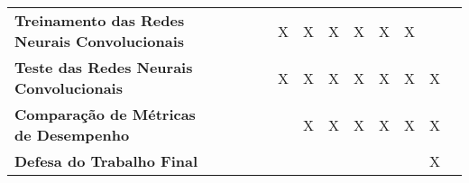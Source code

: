 \begin{table}
\begin{center}
\begin{small}
\begin{tabular}{p{5cm}cccccccccccc}
  \textbf{Treinamento das
  Redes Neurais Convolucionais}         &             &             &             &             &      X      &      X      &      X      &      X      &      X      &      X       &            \\
  \textbf{Teste das Redes
  Neurais Convolucionais}               &             &             &             &             &      X      &      X      &      X      &      X      &      X      &      X       &     X      \\
  \textbf{Comparação de Métricas
  de Desempenho}                        &             &             &             &             &             &      X      &      X      &      X      &      X      &      X      &      X      \\
  \textbf{Defesa do Trabalho Final}     &             &             &             &             &             &             &             &             &             &             &      X      \\
  \bottomrule
\end{tabular}
\end{small}
\end{center}
\end{table}

